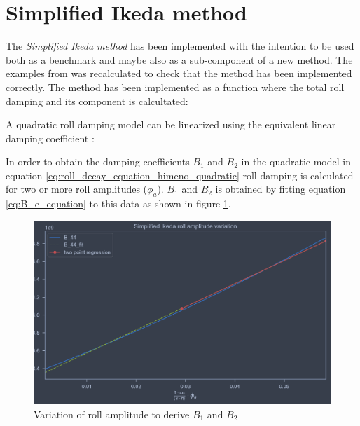 \section{Simplified Ikeda method}
\label{se:simplified_ikeda}
The \emph{Simplified Ikeda method} \cite{kawahara_simple_2011} has been implemented with the intention to be used both as a benchmark and maybe also as a sub-component of a new method. The examples from \cite{kawahara_simple_2011} was recalculated to check that the method has been implemented correctly.
The method has been implemented as a function where the total roll damping and its component is calcultated: 


A quadratic roll damping model can be linearized using the equivalent linear damping coefficient \cite{himeno_prediction_1981}:

In order to obtain the damping coefficients $B_1$ and $B_2$ in the quadratic model in equation \ref{eq:roll_decay_equation_himeno_quadratic} roll damping is calculated for two or more roll amplitudes ($\phi_a$). $B_1$ and $B_2$ is obtained by fitting equation \ref{eq:B_e_equation} to this data as shown in figure \ref{fig:ikeda_B_1_B2}.  

\begin{figure}[H]
    \centering
    \includegraphics[width=\columnwidth]{figures/ikeda_B_1_B_2.pdf}
    \caption{Variation of roll amplitude to derive $B_1$ and $B_2$}
    \label{fig:ikeda_B_1_B2}
\end{figure}